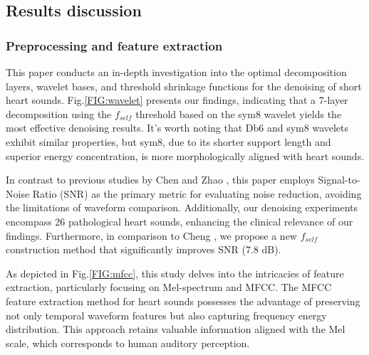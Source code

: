 \subsection{Results discussion}
\subsubsection{Preprocessing and feature extraction}
This paper conducts an in-depth investigation into the optimal decomposition layers, wavelet bases, and threshold shrinkage functions for the denoising of short heart sounds. Fig.\ref{FIG:wavelet} presents our findings, indicating that a 7-layer decomposition using the $f_{self}$ threshold based on the sym8 wavelet yields the most effective denoising results. It's worth noting that Db6 and sym8 wavelets exhibit similar properties, but sym8, due to its shorter support length and superior energy concentration, is more morphologically aligned with heart sounds.

In contrast to previous studies by Chen \cite{2006Research} and Zhao \cite{2010Research}, this paper employs Signal-to-Noise Ratio (SNR) as the primary metric for evaluating noise reduction, avoiding the limitations of waveform comparison. Additionally, our denoising experiments encompass 26 pathological heart sounds, enhancing the clinical relevance of our findings. Furthermore, in comparison to Cheng \cite{cheng2014denoising}, we propose a new $f_{self}$ construction method that significantly improves SNR (7.8 dB).

As depicted in Fig.\ref{FIG:mfcc}, this study delves into the intricacies of feature extraction, particularly focusing on Mel-spectrum and MFCC. The MFCC feature extraction method for heart sounds possesses the advantage of preserving not only temporal waveform features but also capturing frequency energy distribution. This approach retains valuable information aligned with the Mel scale, which corresponds to human auditory perception.

